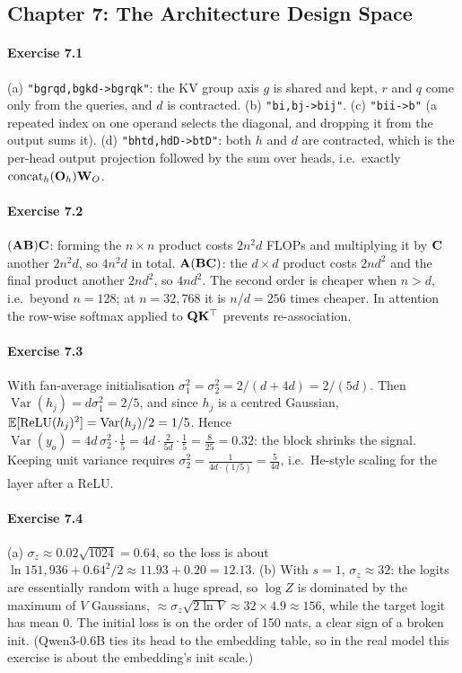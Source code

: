 \subsection*{Chapter 7: The Architecture Design Space}

\paragraph{Exercise 7.1} (a) \texttt{"bgrqd,bgkd->bgrqk"}: the KV group axis $g$ is shared and kept, $r$ and
$q$ come only from the queries, and $d$ is contracted. (b) \texttt{"bi,bj->bij"}. (c) \texttt{"bii->b"}
(a repeated index on one operand selects the diagonal, and dropping it from the output sums it).
(d) \texttt{"bhtd,hdD->btD"}: both $h$ and $d$ are contracted, which is the per-head output projection
followed by the sum over heads, i.e.\ exactly $\mathrm{concat}_h(\mathbf{O}_h)\mathbf{W}_O$.

\paragraph{Exercise 7.2} $(\mathbf{A}\mathbf{B})\mathbf{C}$: forming the $n\times n$ product costs $2n^2d$ FLOPs and
multiplying it by $\mathbf{C}$ another $2n^2d$, so $4n^2d$ in total. $\mathbf{A}(\mathbf{B}\mathbf{C})$: the $d\times d$
product costs $2nd^2$ and the final product another $2nd^2$, so $4nd^2$. The second order is cheaper when
$n>d$, i.e.\ beyond $n=128$; at $n=32{,}768$ it is $n/d=256$ times cheaper. In attention the row-wise
softmax applied to $\mathbf{Q}\mathbf{K}^\top$ prevents re-association.

\paragraph{Exercise 7.3} With fan-average initialisation $\sigma_1^2=\sigma_2^2=2/(d+4d)=2/(5d)$. Then
$\operatorname{Var}(h_j)=d\sigma_1^2=2/5$, and since $h_j$ is a centred Gaussian,
$\mathbb{E}[\mathrm{ReLU}(h_j)^2]=\operatorname{Var}(h_j)/2=1/5$. Hence $\operatorname{Var}(y_o)=4d\,\sigma_2^2\cdot\frac15
=4d\cdot\frac{2}{5d}\cdot\frac15=\frac{8}{25}=0.32$: the block shrinks the signal. Keeping unit variance
requires $\sigma_2^2=\frac{1}{4d\cdot(1/5)}=\frac{5}{4d}$, i.e.\ He-style scaling for the layer after a ReLU.

\paragraph{Exercise 7.4} (a) $\sigma_z\approx0.02\sqrt{1024}=0.64$, so the loss is about
$\ln151{,}936+0.64^2/2\approx11.93+0.20=12.13$. (b) With $s=1$, $\sigma_z\approx32$: the logits are
essentially random with a huge spread, so $\log Z$ is dominated by the maximum of $V$ Gaussians,
$\approx\sigma_z\sqrt{2\ln V}\approx32\times4.9\approx156$, while the target logit has mean 0. The initial loss is
on the order of 150 nats, a clear sign of a broken init. (Qwen3-0.6B ties its head to the embedding table, so
in the real model this exercise is about the embedding's init scale.)


